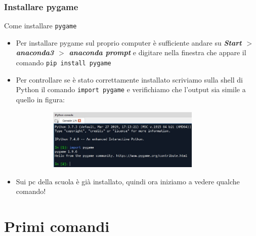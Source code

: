 \documentclass{beamer}
\begin{document}
\begin{frame}[fragile]
\frametitle{Installare pygame}
	\begin{block}{Come installare \texttt{pygame}}
		\begin{itemize}
			\item Per installare pygame sul proprio computer è sufficiente andare su \textit{\textbf{Start $>$ anaconda3 $>$ anaconda prompt}} e digitare nella finestra che appare il comando \texttt{pip install pygame}
			\item Per controllare se è stato correttamente installato scriviamo sulla shell di Python il comando \texttt{import pygame} e verifichiamo che l'output sia simile a quello in figura:
			\begin{figure}[t]
				\includegraphics[height=2.9cm, width=9cm]{images/Import-pygame.jpg}
			\end{figure}
			\item Sui pc della scuola è già installato, quindi ora iniziamo a vedere qualche comando!
		\end{itemize}
	\end{block}
\end{frame}

\section{Primi comandi}
\end{document}
